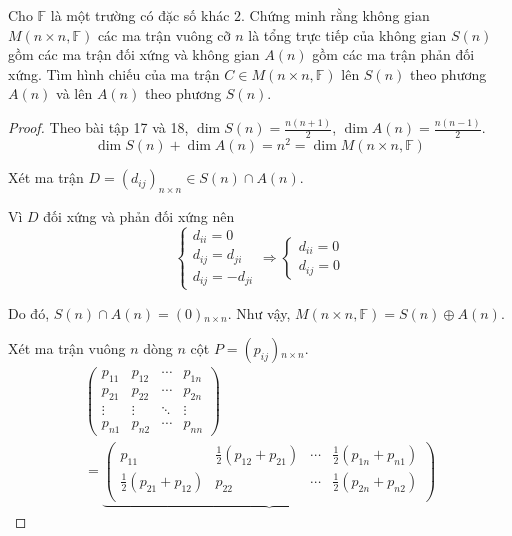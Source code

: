 \documentclass[class=linearalgebra,crop=false]{standalone}
\begin{document}
\begin{exercise}
    Cho $\mathbb{F}$ là một trường có đặc số khác $2$. Chứng minh rằng không gian $M(n\times n, \mathbb{F})$ các ma trận vuông cỡ $n$ là tổng trực tiếp của không gian $S(n)$ gồm các ma trận đối xứng và không gian $A(n)$ gồm các ma trận phản đối xứng. Tìm hình chiếu của ma trận $C\in M(n\times n, \mathbb{F})$ lên $S(n)$ theo phương $A(n)$ và lên $A(n)$ theo phương $S(n)$.
\end{exercise}

\begin{proof}
    Theo bài tập 17 và 18, $\dim S(n) = \frac{n(n+1)}{2}$, $\dim A(n) = \frac{n(n-1)}{2}$.
    \[ \dim S(n) + \dim A(n) = n^{2} = \dim M(n\times n,\mathbb{F}) \]
    \par Xét ma trận $D = (d_{ij})_{n\times n} \in S(n)\cap A(n)$.
    \par Vì $D$ đối xứng và phản đối xứng nên
    \[
        \begin{cases}
            d_{ii} = 0      \\
            d_{ij} = d_{ji} \\
            d_{ij} = - d_{ji}
        \end{cases}
        \Longrightarrow
        \begin{cases}
            d_{ii} = 0 \\
            d_{ij} = 0
        \end{cases}
    \]
    \par Do đó, $S(n) \cap A(n) = (0){}_{n\times n}$. Như vậy, $M(n\times n,\mathbb{F}) = S(n)\oplus A(n)$.
    \par Xét ma trận vuông $n$ dòng $n$ cột $P = (p_{ij}){}_{n\times n}$.
    \begin{gather*}
        \begin{pmatrix}
            p_{11} & p_{12} & \cdots & p_{1n} \\
            p_{21} & p_{22} & \cdots & p_{2n} \\
            \vdots & \vdots & \ddots & \vdots \\
            p_{n1} & p_{n2} & \cdots & p_{nn}
        \end{pmatrix} \\
        =
        \underbrace{
            \begin{pmatrix}
                p_{11}                       & \frac{1}{2}(p_{12} + p_{21}) & \cdots & \frac{1}{2}(p_{1n} + p_{n1}) \\
                \frac{1}{2}(p_{21} + p_{12}) & p_{22}                       & \cdots & \frac{1}{2}(p_{2n} + p_{n2}) \\

\end{pmatrix}}
\end{gather*}
\end{proof}
\end{document}
